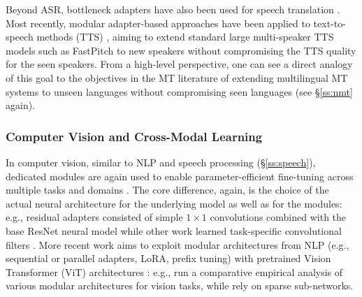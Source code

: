 \documentclass[10pt]{article} %
\begin{document}
Beyond ASR, bottleneck adapters have also been used for speech translation \citep{le-etal-2021-lightweight}. Most recently, modular adapter-based approaches have been applied to text-to-speech methods (TTS) \citep{Hsieh:2022tts,Morioka:2022tts}, aiming to extend standard large multi-speaker TTS models such as FastPitch \citep{Lancucki:2021fastpitch} to new speakers without compromising the TTS quality for the seen speakers. From a high-level perspective, one can see a direct analogy of this goal to the objectives in the MT literature of extending multilingual MT systems to unseen languages without compromising seen languages (see \S\ref{ss:nmt} again).


\subsubsection{Computer Vision and Cross-Modal Learning}
\label{ss:cv}
In computer vision, similar to NLP and speech processing (\S\ref{ss:speech}), dedicated modules are again used to enable parameter-efficient fine-tuning across multiple tasks and domains \citep[\textit{among others}]{Rusu2016Progressive,Rebuffi2018Adapters2,Berriel:2019iccv,He:2022arxiv}. The core difference, again, is the choice of the actual neural architecture for the underlying model as well as for the modules: e.g., residual adapters \citep{Rebuffi2017Adapters1} consisted of simple $1 \times 1$ convolutions combined with the base ResNet neural model \citep{He2016ResNet} while other work learned task-specific convolutional filters \citep{newell2019feature,bragman2019stochastic}.
More recent work aims to exploit modular architectures from NLP (e.g., sequential or parallel adapters, LoRA, prefix tuning) with pretrained Vision Transformer (ViT) architectures \citep{dosovitskiy2020image}: e.g., \citet{He:2022arxiv} run a comparative empirical analysis of various modular architectures for vision tasks, while \citet{Chen:2021neurips} rely on sparse sub-networks. %
\end{document}
